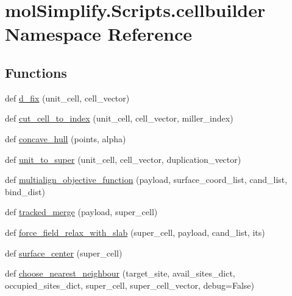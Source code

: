 \hypertarget{namespacemolSimplify_1_1Scripts_1_1cellbuilder}{}\section{mol\+Simplify.\+Scripts.\+cellbuilder Namespace Reference}
\label{namespacemolSimplify_1_1Scripts_1_1cellbuilder}
\subsection*{Functions}
\begin{DoxyCompactItemize}
\item 
def \hyperlink{namespacemolSimplify_1_1Scripts_1_1cellbuilder_aaa2c8215e193268c0ff32ad42d4f8e49}{d\+\_\+fix} (unit\+\_\+cell, cell\+\_\+vector)
\item 
def \hyperlink{namespacemolSimplify_1_1Scripts_1_1cellbuilder_abd88c02a40cf39272066d182fbe03f9b}{cut\+\_\+cell\+\_\+to\+\_\+index} (unit\+\_\+cell, cell\+\_\+vector, miller\+\_\+index)
\item 
def \hyperlink{namespacemolSimplify_1_1Scripts_1_1cellbuilder_acd7ea80dcb90551cd45034265ce9167a}{concave\+\_\+hull} (points, alpha)
\item 
def \hyperlink{namespacemolSimplify_1_1Scripts_1_1cellbuilder_aec9d3d7265cea3db6f059ff4623ed6d4}{unit\+\_\+to\+\_\+super} (unit\+\_\+cell, cell\+\_\+vector, duplication\+\_\+vector)
\item 
def \hyperlink{namespacemolSimplify_1_1Scripts_1_1cellbuilder_a7d1ad6f9e75d15febfb49de0eff2435e}{multialign\+\_\+objective\+\_\+function} (payload, surface\+\_\+coord\+\_\+list, cand\+\_\+list, bind\+\_\+dist)
\item 
def \hyperlink{namespacemolSimplify_1_1Scripts_1_1cellbuilder_aef81677966d6e58581a866d25edfa569}{tracked\+\_\+merge} (payload, super\+\_\+cell)
\item 
def \hyperlink{namespacemolSimplify_1_1Scripts_1_1cellbuilder_aa92fa2d5a77b000fb93afae3837b24e2}{force\+\_\+field\+\_\+relax\+\_\+with\+\_\+slab} (super\+\_\+cell, payload, cand\+\_\+list, its)
\item 
def \hyperlink{namespacemolSimplify_1_1Scripts_1_1cellbuilder_a48ee19bf71a01a803e6e2a785b92e4f2}{surface\+\_\+center} (super\+\_\+cell)
\item 
def \hyperlink{namespacemolSimplify_1_1Scripts_1_1cellbuilder_a333748f981e736ebf58c0fccf9f5fad8}{choose\+\_\+nearest\+\_\+neighbour} (target\+\_\+site, avail\+\_\+sites\+\_\+dict, occupied\+\_\+sites\+\_\+dict, super\+\_\+cell, super\+\_\+cell\+\_\+vector, debug=False)

\end{DoxyCompactItemize}
